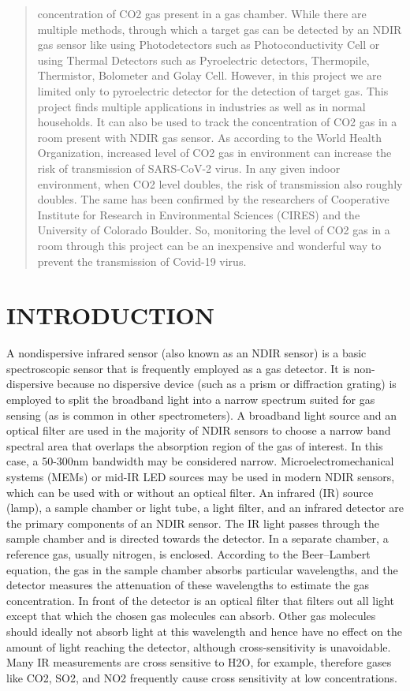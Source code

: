 \documentclass[12pt]{article}
\begin{document}
\begin{abstract}
concentration of CO2 gas present in a gas chamber. 
While there are multiple methods, through which a target gas can be detected 
by an NDIR gas sensor like using Photodetectors such as Photoconductivity Cell
or using Thermal Detectors such as Pyroelectric detectors, Thermopile, 
Thermistor, Bolometer and Golay Cell. However, in this project we are limited 
only to pyroelectric detector for the detection of target gas.
This project finds multiple applications in industries as well as in normal 
households. It can also be used to track the concentration of CO2 gas in a room 
present with NDIR gas sensor. As according to the World Health Organization, 
increased level of CO2 gas in environment can increase the risk of transmission 
of SARS-CoV-2 virus. In any given indoor environment, when CO2 level doubles, 
the risk of transmission also roughly doubles. The same has been confirmed by 
the researchers of Cooperative Institute for Research in Environmental Sciences 
(CIRES) and the University of Colorado Boulder. So, monitoring the level of CO2
gas in a room through this project can be an inexpensive and wonderful way to 
prevent the transmission of Covid-19 virus.
\end{abstract}
\clearpage

\section{INTRODUCTION}
A nondispersive infrared sensor (also known as an NDIR sensor) is a basic spectroscopic sensor that is frequently employed as a gas detector. It is non-dispersive because no dispersive device (such as a prism or diffraction grating) is employed to split the broadband light into a narrow spectrum suited for gas sensing (as is common in other spectrometers). A broadband light source and an optical filter are used in the majority of NDIR sensors to choose a narrow band spectral area that overlaps the absorption region of the gas of interest. In this case, a 50-300nm bandwidth may be considered narrow. Microelectromechanical systems (MEMs) or mid-IR LED sources may be used in modern NDIR sensors, which can be used with or without an optical filter.
An infrared (IR) source (lamp), a sample chamber or light tube, a light filter, and an infrared detector are the primary components of an NDIR sensor. The IR light passes through the sample chamber and is directed towards the detector. In a separate chamber, a reference gas, usually nitrogen, is enclosed. According to the Beer–Lambert equation, the gas in the sample chamber absorbs particular wavelengths, and the detector measures the attenuation of these wavelengths to estimate the gas concentration. In front of the detector is an optical filter that filters out all light except that which the chosen gas molecules can absorb.
Other gas molecules should ideally not absorb light at this wavelength and hence have no effect on the amount of light reaching the detector, although cross-sensitivity is unavoidable.  Many IR measurements are cross sensitive to H2O, for example, therefore gases like CO2, SO2, and NO2 frequently cause cross sensitivity at low concentrations.
\end{document}
